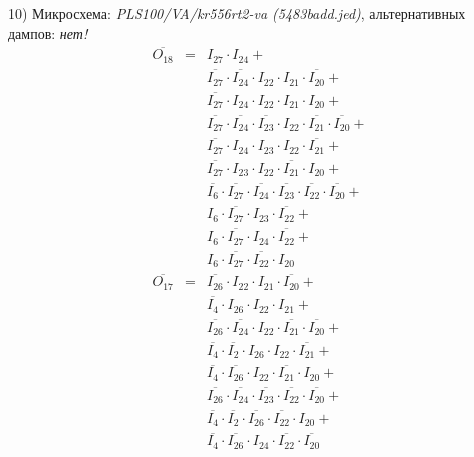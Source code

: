 \documentclass[a4paper,russian]{report}
\begin{document}
10) Микросхема: \emph{PLS100/VA/kr556rt2-va  (5483badd.jed)}, альтернативных дампов: \emph{нет!}
\nopagebreak\begin{eqnarray*}
    \overline{O_{18}} & = & I_{27} \cdotp I_{24} + \\
	& &  \overline{I_{27}} \cdotp \overline{I_{24}} \cdotp I_{22} \cdotp I_{21} \cdotp \overline{I_{20}} + \\
	& &  \overline{I_{27}} \cdotp I_{24} \cdotp I_{22} \cdotp I_{21} \cdotp I_{20} + \\
	& &  \overline{I_{27}} \cdotp \overline{I_{24}} \cdotp \overline{I_{23}} \cdotp I_{22} \cdotp \overline{I_{21}} \cdotp \overline{I_{20}} + \\
	& &  \overline{I_{27}} \cdotp I_{24} \cdotp I_{23} \cdotp I_{22} \cdotp \overline{I_{21}} + \\
	& &  \overline{I_{27}} \cdotp I_{23} \cdotp I_{22} \cdotp \overline{I_{21}} \cdotp I_{20} + \\
	& &  \overline{I_{6}} \cdotp \overline{I_{27}} \cdotp \overline{I_{24}} \cdotp \overline{I_{23}} \cdotp \overline{I_{22}} \cdotp \overline{I_{20}} + \\
	& &  I_{6} \cdotp \overline{I_{27}} \cdotp I_{23} \cdotp \overline{I_{22}} + \\
	& &  I_{6} \cdotp \overline{I_{27}} \cdotp I_{24} \cdotp \overline{I_{22}} + \\
	& &  I_{6} \cdotp \overline{I_{27}} \cdotp \overline{I_{22}} \cdotp I_{20} \\
    \overline{O_{17}} & = & \overline{I_{26}} \cdotp I_{22} \cdotp I_{21} \cdotp \overline{I_{20}} + \\
	& &  \overline{I_{4}} \cdotp I_{26} \cdotp I_{22} \cdotp I_{21} + \\
	& &  \overline{I_{26}} \cdotp \overline{I_{24}} \cdotp I_{22} \cdotp \overline{I_{21}} \cdotp \overline{I_{20}} + \\
	& &  \overline{I_{4}} \cdotp \overline{I_{2}} \cdotp I_{26} \cdotp I_{22} \cdotp \overline{I_{21}} + \\
	& &  \overline{I_{4}} \cdotp \overline{I_{26}} \cdotp I_{22} \cdotp \overline{I_{21}} \cdotp I_{20} + \\
	& &  \overline{I_{26}} \cdotp \overline{I_{24}} \cdotp \overline{I_{23}} \cdotp \overline{I_{22}} \cdotp \overline{I_{20}} + \\
	& &  \overline{I_{4}} \cdotp \overline{I_{2}} \cdotp \overline{I_{26}} \cdotp \overline{I_{22}} \cdotp I_{20} + \\
	& &  \overline{I_{4}} \cdotp \overline{I_{26}} \cdotp I_{24} \cdotp \overline{I_{22}} \cdotp \overline{I_{20}} \\

\end{eqnarray*}
\end{document}
